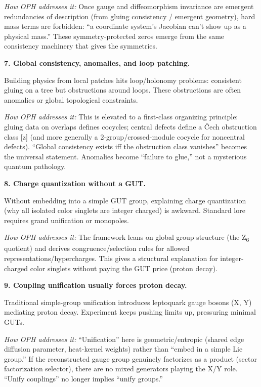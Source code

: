 \documentclass[11pt,a4paper]{article}
\theoremstyle{remark}
\begin{document}
\emph{How OPH addresses it:} Once gauge and diffeomorphism invariance are emergent redundancies of description (from gluing consistency / emergent geometry), hard mass terms are forbidden: ``a coordinate system's Jacobian can't show up as a physical mass.'' These symmetry-protected zeros emerge from the same consistency machinery that gives the symmetries.

\textbf{7. Global consistency, anomalies, and loop patching.}

Building physics from local patches hits loop/holonomy problems: consistent gluing on a tree but obstructions around loops. These obstructions are often anomalies or global topological constraints.

\emph{How OPH addresses it:} This is elevated to a first-class organizing principle: gluing data on overlaps defines cocycles; central defects define a \v{C}ech obstruction class {[}z{]} (and more generally a 2-group/crossed-module cocycle for noncentral defects). ``Global consistency exists iff the obstruction class vanishes'' becomes the universal statement. Anomalies become ``failure to glue,'' not a mysterious quantum pathology.

\textbf{8. Charge quantization without a GUT.}

Without embedding into a simple GUT group, explaining charge quantization (why all isolated color singlets are integer charged) is awkward. Standard lore requires grand unification or monopoles.

\emph{How OPH addresses it:} The framework leans on global group structure (the Z\textsubscript{6} quotient) and derives congruence/selection rules for allowed representations/hypercharges. This gives a structural explanation for integer-charged color singlets without paying the GUT price (proton decay).

\textbf{9. Coupling unification usually forces proton decay.}

Traditional simple-group unification introduces leptoquark gauge bosons (X, Y) mediating proton decay. Experiment keeps pushing limits up, pressuring minimal GUTs.

\emph{How OPH addresses it:} ``Unification'' here is geometric/entropic (shared edge diffusion parameter, heat-kernel weights) rather than ``embed in a simple Lie group.'' If the reconstructed gauge group genuinely factorizes as a product (sector factorization selector), there are no mixed generators playing the X/Y role. ``Unify couplings'' no longer implies ``unify groups.''
\end{document}

